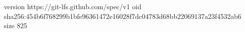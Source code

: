 version https://git-lfs.github.com/spec/v1
oid sha256:454b6f768299b1bfe96361472e16028f7dc04783d68bb22069137a23f4532ab6
size 825
